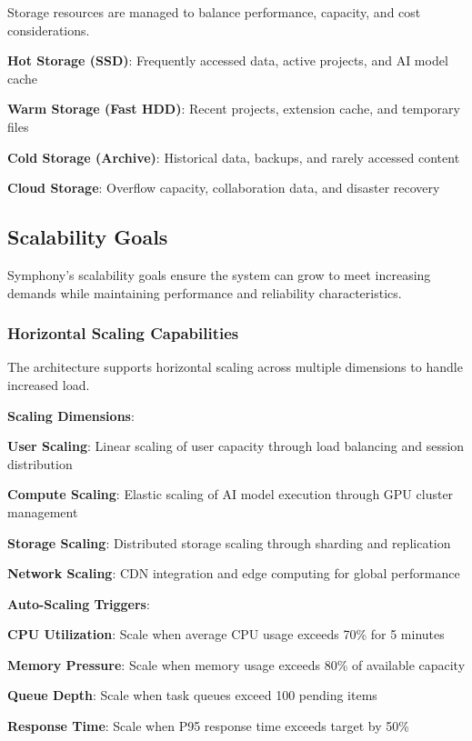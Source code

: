 Storage resources are managed to balance performance, capacity, and cost considerations.

\begin{infobox}[title=Storage Tier Strategy]
\textbf{Hot Storage (SSD)}: Frequently accessed data, active projects, and AI model cache

\textbf{Warm Storage (Fast HDD)}: Recent projects, extension cache, and temporary files

\textbf{Cold Storage (Archive)}: Historical data, backups, and rarely accessed content

\textbf{Cloud Storage}: Overflow capacity, collaboration data, and disaster recovery
\end{infobox}

\subsection*{Scalability Goals}

Symphony's scalability goals ensure the system can grow to meet increasing demands while maintaining performance and reliability characteristics.

\subsubsection*{Horizontal Scaling Capabilities}

The architecture supports horizontal scaling across multiple dimensions to handle increased load.

\textbf{Scaling Dimensions}:
\begin{expandedlist}
    \item \textbf{User Scaling}: Linear scaling of user capacity through load balancing and session distribution
    \item \textbf{Compute Scaling}: Elastic scaling of AI model execution through GPU cluster management
    \item \textbf{Storage Scaling}: Distributed storage scaling through sharding and replication
    \item \textbf{Network Scaling}: CDN integration and edge computing for global performance
\end{expandedlist}

\textbf{Auto-Scaling Triggers}:
\begin{compactlist}
    \item \textbf{CPU Utilization}: Scale when average CPU usage exceeds 70\% for 5 minutes
    \item \textbf{Memory Pressure}: Scale when memory usage exceeds 80\% of available capacity
    \item \textbf{Queue Depth}: Scale when task queues exceed 100 pending items
    \item \textbf{Response Time}: Scale when P95 response time exceeds target by 50\%
\end{compactlist}

